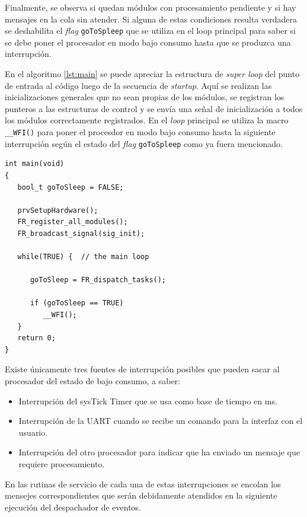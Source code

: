 Finalmente, se observa si quedan módulos con procesamiento pendiente y si hay mensajes en la cola sin atender.  Si alguna de estas condiciones resulta verdadera se deshabilita el \textit{flag} \texttt{goToSpleep} que se utiliza en el loop principal para saber si se debe poner el procesador en modo bajo consumo hasta que se produzca una interrupción.

En el algoritmo \ref{lst:main} se puede apreciar la estructura de \textit{super loop} del punto de entrada al código luego de la secuencia de \textit{startup}.  Aquí se realizan las inicializaciones generales que no sean propias de los módulos, se registran los punteros a las estructuras de control y se envía una señal de inicialización a todos los módulos correctamente registrados.  En el \textit{loop} principal se utiliza la macro \texttt{\_\_WFI()} para poner el procesdor en modo bajo consumo hasta la siguiente interrupción según el estado del \textit{flag} \texttt{goToSpleep} como ya fuera mencionado.

\vspace{10px}%
\begin{lstlisting}[caption={Función principal main().},label={lst:main}]
int main(void)
{
   bool_t goToSleep = FALSE;

   prvSetupHardware();
   FR_register_all_modules();
   FR_broadcast_signal(sig_init);

   while(TRUE) {  // the main loop

      goToSleep = FR_dispatch_tasks();

      if (goToSleep == TRUE)
         __WFI();
   }
   return 0;
}
\end{lstlisting}

Existe únicamente tres fuentes de interrupción posibles que pueden sacar al procesador del estado de bajo consumo, a saber:

\begin{itemize}
	\item Interrupción del sysTick Timer que se usa como base de tiempo en ms.
	\item Interrupción de la UART cuando se recibe un comando para la interfaz con el usuario.
	\item Interrupción del otro procesador para indicar que ha enviado un mensaje que requiere procesamiento.
\end{itemize}

En las rutinas de servicio de cada una de estas interrupciones se encolan los mensejes correspondientes que serán debidamente atendidos en la siguiente ejecución del despachador de eventos.  

